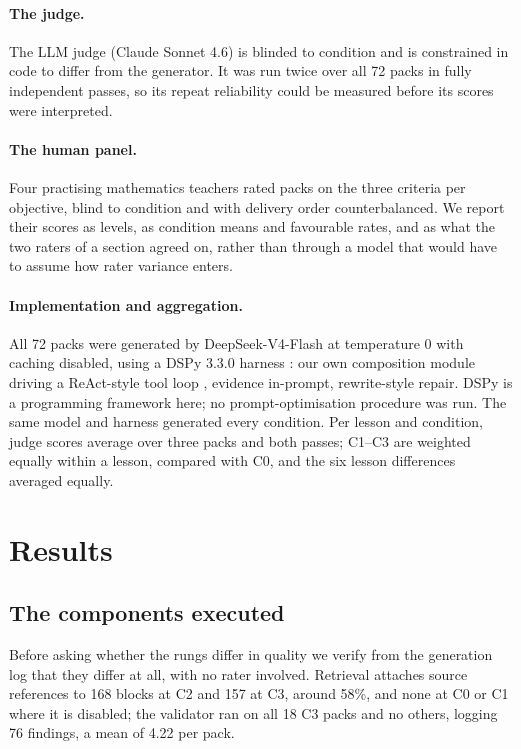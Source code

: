 \documentclass{article}
\begin{document}
\paragraph{The judge.}
The LLM judge (Claude Sonnet 4.6) is blinded to condition and is constrained in code to
differ from the generator. It was run twice over all 72 packs in fully independent passes, so its
repeat reliability could be measured before its scores were interpreted.

\paragraph{The human panel.}
Four practising mathematics teachers rated packs on the three criteria per objective, blind to
condition and with delivery order counterbalanced. We report their scores as levels, as
condition means and favourable rates, and as what the two raters of a section agreed on, rather
than through a model that would have to assume how rater variance enters.

\paragraph{Implementation and aggregation.}
All 72 packs were generated by DeepSeek-V4-Flash at temperature 0 with caching disabled, using a DSPy 3.3.0 harness \citep{dspy}: our own
composition module driving a ReAct-style tool loop \citep{react}, evidence
in-prompt, rewrite-style repair. DSPy is a programming framework here; no prompt-optimisation
procedure was run. The same model and harness generated every condition. Per lesson and
condition,
judge scores average over three packs and both passes; C1--C3 are weighted equally within a
lesson, compared with C0, and the six lesson differences averaged equally.

\section{Results}
\label{sec:results}

\subsection{The components executed}

Before asking whether the rungs differ in quality we verify from the generation log that they
differ at all, with no rater involved. Retrieval attaches source references to 168 blocks at C2
and 157 at C3, around 58\%, and none at C0 or C1 where it is disabled; the validator ran on all
18 C3 packs and no others, logging 76 findings, a mean of 4.22 per pack.
\end{document}
